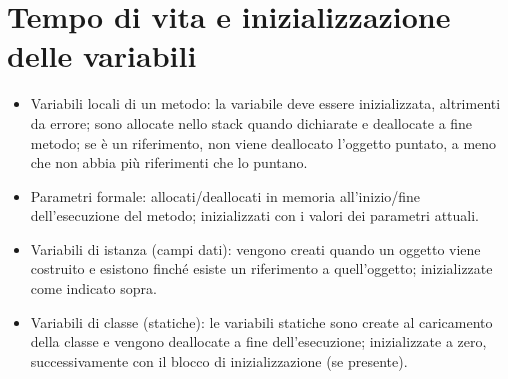 \section{Tempo di vita e inizializzazione delle variabili}
\begin{itemize}
\item Variabili locali di un metodo: la variabile deve essere inizializzata, altrimenti da errore; sono allocate nello stack quando dichiarate e deallocate a fine metodo; se è un riferimento, non viene deallocato l'oggetto puntato, a meno che non abbia più riferimenti che lo puntano. 
\item Parametri formale: allocati/deallocati in memoria all'inizio/fine dell'esecuzione del metodo; inizializzati con i valori dei parametri attuali.
\item Variabili di istanza (campi dati): vengono creati quando un oggetto viene costruito e esistono finché esiste un riferimento a quell'oggetto; inizializzate come indicato sopra. 
\item Variabili di classe (statiche): le variabili statiche sono create al caricamento della classe e vengono deallocate a fine dell'esecuzione; inizializzate a zero, successivamente con il blocco di inizializzazione (se presente).
\end{itemize}

